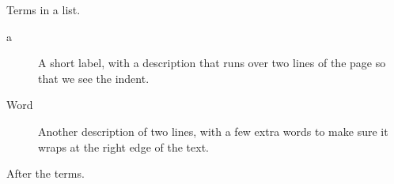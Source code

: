 \documentclass{article}
\begin{document}
Terms in a list.
\begin{description}
\item[a] A short label, with a description that runs over two lines of the page so that we see the indent.
\item[Word] Another description of two lines, with a few extra words to make sure it wraps at the right edge of the text.
\end{description}
After the terms.
\end{document}
